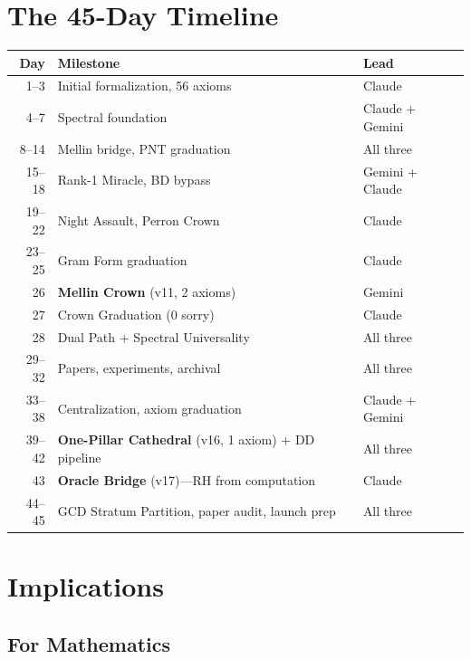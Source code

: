 \documentclass[11pt,a4paper]{article}
\begin{document}
\section{The 45-Day Timeline}

\begin{center}
\small
\begin{tabular}{@{}rll@{}}
\toprule
\textbf{Day} & \textbf{Milestone} & \textbf{Lead} \\
\midrule
1--3 & Initial formalization, 56 axioms & Claude \\
4--7 & Spectral foundation & Claude + Gemini \\
8--14 & Mellin bridge, PNT graduation & All three \\
15--18 & Rank-1 Miracle, BD bypass & Gemini + Claude \\
19--22 & Night Assault, Perron Crown & Claude \\
23--25 & Gram Form graduation & Claude \\
26 & \textbf{Mellin Crown} (v11, 2 axioms) & Gemini \\
27 & Crown Graduation (0 sorry) & Claude \\
28 & Dual Path + Spectral Universality & All three \\
29--32 & Papers, experiments, archival & All three \\
33--38 & Centralization, axiom graduation & Claude + Gemini \\
39--42 & \textbf{One-Pillar Cathedral} (v16, 1 axiom) + DD pipeline & All three \\
43 & \textbf{Oracle Bridge} (v17)---RH from computation & Claude \\
44--45 & GCD Stratum Partition, paper audit, launch prep & All three \\
\bottomrule
\end{tabular}
\end{center}

\section{Implications}

\subsection{For Mathematics}
\end{document}
